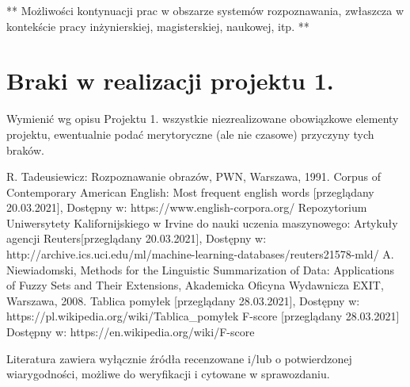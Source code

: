 \documentclass{classrep}
\begin{document}
** Możliwości kontynuacji prac w obszarze systemów rozpoznawania, zwłaszcza w kontekście pracy inżynierskiej,
magisterskiej, naukowej, itp. **\\



\section{Braki w realizacji projektu 1.}
Wymienić wg opisu Projektu 1. wszystkie niezrealizowane obowiązkowe elementy projektu, ewentualnie
podać merytoryczne (ale nie czasowe) przyczyny tych braków. 


\begin{thebibliography}{0}
 R. Tadeusiewicz: Rozpoznawanie obrazów, PWN, Warszawa, 1991.  
 Corpus of Contemporary American English: Most frequent english words [przeglądany  20.03.2021], Dostępny w: https://www.english-corpora.org/
 Repozytorium Uniwersytety Kalifornijskiego w Irvine do nauki uczenia maszynowego: Artykuły agencji Reuters[przeglądany 20.03.2021], 
Dostępny w: http://archive.ics.uci.edu/ml/machine-learning-databases/reuters21578-mld/
 A. Niewiadomski, Methods for the Linguistic Summarization of Data: Applications of Fuzzy Sets and Their Extensions, Akademicka Oficyna Wydawnicza EXIT, Warszawa, 2008.
 Tablica pomyłek [przeglądany 28.03.2021], Dostępny w: https://pl.wikipedia.org/wiki/Tablica\_pomyłek
 F-score [przeglądany 28.03.2021] Dostępny w: https://en.wikipedia.org/wiki/F-score
\end{thebibliography}

Literatura zawiera wyłącznie źródła recenzowane i/lub o potwierdzonej wiarygodności,
możliwe do weryfikacji i cytowane w sprawozdaniu. 
\end{document}
